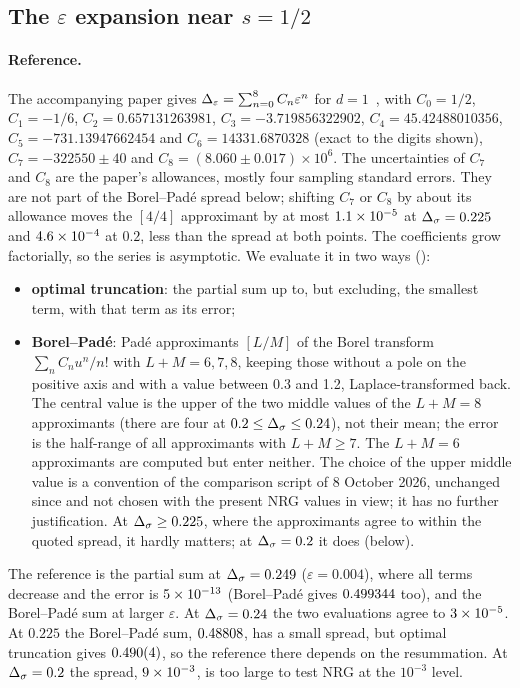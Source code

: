 \subsection{The \texorpdfstring{$\varepsilon$}{epsilon} expansion near \texorpdfstring{$s=1/2$}{s = 1/2}}\label{nrg:sec:series}
\paragraph{Reference.} The accompanying paper gives $\Delta_\varepsilon=\sum_{n=0}^{8}C_n\varepsilon^n$ for $d=1$~\cite{nrg:Paper}, with
$C_0=1/2$, $C_1=-1/6$, $C_2=0.657131263981$, $C_3=-3.719856322902$, $C_4=45.42488010356$, $C_5=-731.13947662454$ and
$C_6=14331.6870328$ (exact to the digits shown), $C_7=-322550\pm40$ and $C_8=(8.060\pm0.017)\times10^6$. The uncertainties of $C_7$
and $C_8$ are the paper's allowances, mostly four sampling standard errors. They are not part of the Borel--Pad\'e spread below;
shifting $C_7$ or $C_8$ by about its allowance moves the $[4/4]$ approximant by at most $1.1\times10^{-5}$ at $\Delta_\sigma=0.225$ and
$4.6\times10^{-4}$ at $0.2$, less than the spread at both points. The coefficients grow factorially, so the series is asymptotic.
We evaluate it in two ways ():
\begin{itemize}
\item \textbf{optimal truncation}: the partial sum up to, but excluding, the smallest term, with that term as its error;
\item \textbf{Borel--Pad\'e}: Pad\'e approximants $[L/M]$ of the Borel transform $\sum_nC_nu^n/n!$ with $L+M=6,7,8$, keeping those
  without a pole on the positive axis and with a value between 0.3 and 1.2, Laplace-transformed back. The central value is the upper
  of the two middle values of the $L+M=8$ approximants (there are four at $0.2\le\Delta_\sigma\le0.24$), not their mean; the error is the
  half-range of all approximants with $L+M\ge7$. The $L+M=6$ approximants are computed but enter neither. The choice of the upper
  middle value is a convention of the comparison script of 8 October 2026, unchanged since and not chosen with the present NRG values
  in view; it has no further justification. At $\Delta_\sigma\ge0.225$, where the approximants agree to within the quoted spread, it hardly
  matters; at $\Delta_\sigma=0.2$ it does (below).
\end{itemize}
The reference is the partial sum at $\Delta_\sigma=0.249$ ($\varepsilon=0.004$), where all terms decrease and the error is
$5\times10^{-13}$ (Borel--Pad\'e gives $0.499344$ too), and the Borel--Pad\'e sum at larger $\varepsilon$. At
$\Delta_\sigma=0.24$ the two evaluations agree to $3\times10^{-5}$. At $0.225$ the Borel--Pad\'e sum, $0.48808$, has a small
spread, but optimal truncation gives $0.490(4)$, so the reference there depends on the resummation. At $\Delta_\sigma=0.2$ the
spread, $9\times10^{-3}$, is too large to test NRG at the $10^{-3}$ level.

